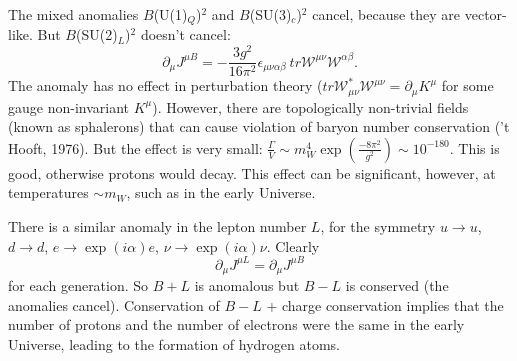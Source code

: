 The mixed anomalies $B$(U(1)$_Q$)$^2$ and $B$(SU(3)$_c$)$^2$ cancel, because they are vector-like. But $B$(SU(2)$_L$)$^2$ doesn't cancel:
\begin{equation}
\partial_\mu J^{\mu B} = - \frac{3g^2}{16 \pi^2} \epsilon_{\mu \nu \alpha \beta}\ tr \mathcal{W}^{\mu \nu} \mathcal{W}^{\alpha \beta}.
\end{equation}
The anomaly has no effect in perturbation theory ($tr\mathcal{W}_{\mu \nu}^* \mathcal{W}^{\mu \nu}  = \partial_\mu K^\mu$ for some gauge non-invariant $K^\mu$). However, there are topologically non-trivial fields (known as sphalerons) that can cause violation of baryon number conservation ('t Hooft, 1976). But the effect is very small: $\frac{\Gamma}{V} \sim m_W^4 \exp(\frac{-8\pi^2}{g^2}) \sim 10^{-180}$. This is good, otherwise protons would decay. This effect can be significant, however, at temperatures $\sim m_W$, such as in the early Universe.

There is a similar anomaly in the lepton number $L$, for the symmetry  $u \to u$, $d \to d$, $e \to \exp{(i\alpha)}e$, $\nu \to \exp{(i\alpha)}\nu$. Clearly
\begin{equation}
\partial_\mu J^{\mu L} = \partial_\mu J^{\mu B}
\end{equation}
for each generation. So $B + L$ is anomalous but $B-L$ is conserved (the anomalies cancel). Conservation of $B-L$ + charge conservation implies that the number of protons and the number of electrons were the same in the early Universe, leading to the formation of hydrogen atoms.